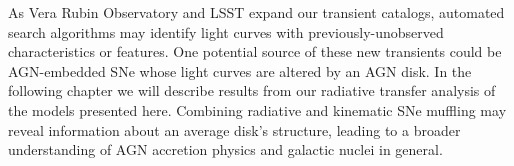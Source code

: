 As Vera Rubin Observatory and LSST expand our transient catalogs, automated search algorithms may identify light curves with previously-unobserved characteristics or features.
One potential source of these new transients could be AGN-embedded SNe whose light curves are altered by an AGN disk.
In the following chapter we will describe results from our radiative transfer analysis of the models presented here.
Combining radiative and kinematic SNe muffling may reveal information about an average disk's structure, leading to a broader understanding of AGN accretion physics and galactic nuclei in general.






% 
